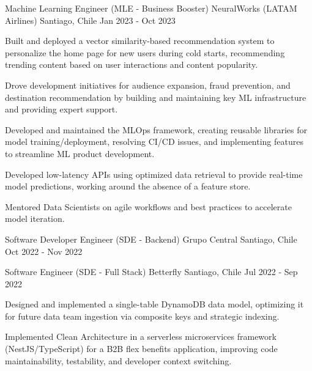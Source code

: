 \cventry
{Machine Learning Engineer (MLE - Business Booster)}
{NeuralWorks (LATAM Airlines)}
{Santiago, Chile}
{Jan 2023 - Oct 2023}
{
  \begin{cvitems}
    \item Built and deployed a vector similarity-based recommendation system to personalize the home page for new users during cold starts, recommending trending content based on user interactions and content popularity.
    \item Drove development initiatives for audience expansion, fraud prevention, and destination recommendation by building and maintaining key ML infrastructure and providing expert support.
    \item Developed and maintained the MLOps framework, creating reusable libraries for model training/deployment, resolving CI/CD issues, and implementing features to streamline ML product development.
    \item Developed low-latency APIs using optimized data retrieval to provide real-time model predictions, working around the absence of a feature store.
    \item Mentored Data Scientists on agile workflows and best practices to accelerate model iteration.
  \end{cvitems}
}

\cventry
{Software Developer Engineer (SDE - Backend)}
{Grupo Central}
{Santiago, Chile}
{Oct 2022 - Nov 2022}
{}

\cventry
{Software Engineer (SDE - Full Stack)}
{Betterfly}
{Santiago, Chile}
{Jul 2022 - Sep 2022}
{
  \begin{cvitems}
    \item Designed and implemented a single-table DynamoDB data model, optimizing it for future data team ingestion via composite keys and strategic indexing.
    \item Implemented Clean Architecture in a serverless microservices framework (NestJS/TypeScript) for a B2B flex benefits application, improving code maintainability, testability, and developer context switching.
  \end{cvitems}
}

